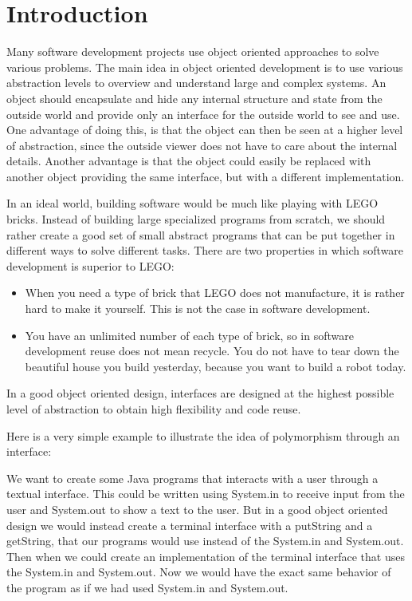 
\section{Introduction}

Many software development projects use object oriented approaches
to solve various problems. The main idea in object oriented development
is to use various abstraction levels to overview and understand large
and complex systems. An object should encapsulate and hide any internal
structure and state from the outside world and provide only an interface
for the outside world to see and use. One advantage of doing this,
is that the object can then be seen at a higher level of abstraction,
since the outside viewer does not have to care about the internal
details. Another advantage is that the object could easily be replaced
with another object providing the same interface, but with a different
implementation.

In an ideal world, building software would be much like playing with
LEGO bricks. Instead of building large specialized programs from scratch,
we should rather create a good set of small abstract programs that
can be put together in different ways to solve different tasks. There
are two properties in which software development is superior to LEGO:
\begin{itemize}
\item When you need a type of brick that LEGO does not manufacture, it is
rather hard to make it yourself. This is not the case in software
development. 
\item You have an unlimited number of each type of brick, so in software
development reuse does not mean recycle. You do not have to tear down
the beautiful house you build yesterday, because you want to build
a robot today.
\end{itemize}
In a good object oriented design, interfaces are designed at the highest
possible level of abstraction to obtain high flexibility and code
reuse.

Here is a very simple example to illustrate the idea of polymorphism
through an interface: 

We want to create some Java programs that interacts with a user through
a textual interface. This could be written using System.in to receive
input from the user and System.out to show a text to the user. But
in a good object oriented design we would instead create a terminal
interface with a putString and a getString, that our programs would
use instead of the System.in and System.out. Then when we could create
an implementation of the terminal interface that uses the System.in
and System.out. Now we would have the exact same behavior of the program
as if we had used System.in and System.out.

